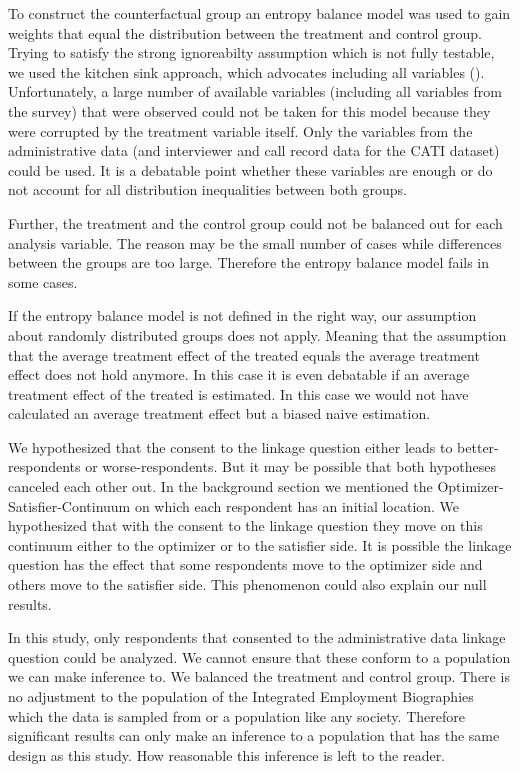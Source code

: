To construct the counterfactual group an entropy balance model was used to gain weights that equal the distribution between the treatment and control group. Trying to satisfy the strong ignoreabilty assumption which is not fully testable, we used the kitchen sink approach, which advocates including all variables (\cite{Eckmanetal15b}). Unfortunately, a large number of available variables (including all variables from the survey) that were observed could not be taken for this model because they were corrupted by the treatment variable itself. Only the variables from the administrative data (and interviewer and call record data for the CATI dataset) could be used. It is a debatable point whether these variables are enough or do not account for all distribution inequalities between both groups.

Further, the treatment and the control group could not be balanced out for each analysis variable. The reason may be the small number of cases while differences between the groups are too large. Therefore the entropy balance model fails in some cases.

If the entropy balance model is not defined in the right way, our assumption about randomly distributed groups does not apply. Meaning that the assumption that the average treatment effect of the treated equals the average treatment effect does not hold anymore. In this case it is even debatable if an average treatment effect of the treated is estimated. In this case we would not have calculated an average treatment effect but a biased naive estimation.

We hypothesized that the consent to the linkage question either leads to better-respondents or worse-respondents. But it may be possible that both hypotheses canceled each other out. In the background section we mentioned the Optimizer-Satisfier-Continuum on which each respondent has an initial location. We hypothesized that with the consent to the linkage question they move on this continuum either to the optimizer or to the satisfier side. It is possible the linkage question has the effect that some respondents move to the optimizer side and others move to the satisfier side. This phenomenon could also explain our null results.

In this study, only respondents that consented to the administrative data linkage question could be analyzed. We cannot ensure that these conform to a population we can make inference to. We balanced the treatment and control group. There is no adjustment to the population of the Integrated Employment Biographies which the data is sampled from or a population like any society. Therefore significant results can only make an inference to a population that has the same design as this study. How reasonable this inference is left to the reader.

